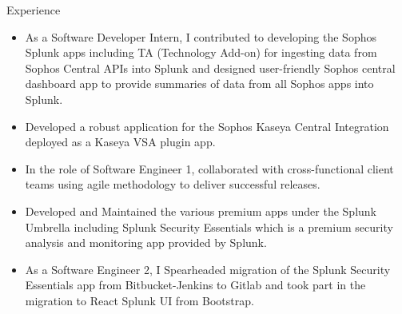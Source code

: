\documentclass{resume} %
\begin{document}
        \begin{workSection}{Experience}
            
            \experienceItem[
                company=Crest Data Systems LLP,
                position=Software Engineer 2,
                duration=Jan 2021-Aug2022
            ]
            
            \begin{itemize}
                \itemsep -6pt {}\item As a Software Developer Intern, I contributed to developing the Sophos Splunk apps including TA (Technology Add-on) for ingesting data from Sophos Central APIs into Splunk and designed user-friendly Sophos central dashboard app to provide summaries of data from all Sophos apps into Splunk.\item Developed a robust application for the Sophos Kaseya Central Integration deployed as a Kaseya VSA plugin app.\item In the role of Software Engineer 1, collaborated with cross-functional client teams using agile methodology to deliver successful releases.\item Developed and Maintained the various premium apps under the Splunk Umbrella including Splunk Security Essentials which is a  premium security analysis and monitoring app provided by Splunk.\item As a Software Engineer 2, I Spearheaded migration of the Splunk Security Essentials app from Bitbucket-Jenkins to Gitlab and took part in the migration to React Splunk UI from Bootstrap.
            \end{itemize}
        


        \end{workSection}
\end{document}
